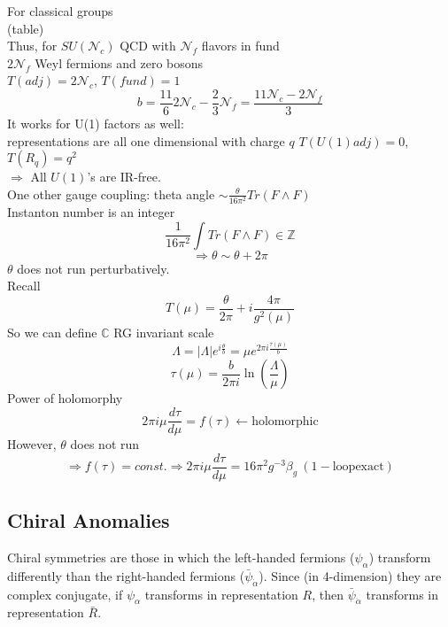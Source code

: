 \documentclass[type = bachelor]{fduthesis-en}
\begin{document}
For classical groups\\
(table)\\
Thus, for $SU(\mathcal{N}_c)$ QCD with $\mathcal{N}_f$ flavors in fund\\ 
$2 \mathcal{N}_f$ Weyl fermions and zero bosons\\
$T(adj)=2\mathcal{N}_c$, $T(fund)=1$
\begin{equation}
b=\frac{11}{6}2\mathcal{N}_c-\frac{2}{3}\mathcal{N}_f=\frac{11\mathcal{N}_c-2\mathcal{N}_f}{3}
\end{equation}
It works for U(1) factors as well:\\
representations are all one dimensional with charge $q$
$T(U(1)adj)=0$, $T(R_q)=q^2$\\
$\Rightarrow$ All $U(1)$'s are IR-free.\\
One other gauge coupling: theta angle $\sim\frac{\theta}{16\pi^2}Tr(F\wedge F)$\\
Instanton number is an integer
\begin{equation}
\frac{1}{16\pi^2}\int Tr(F\wedge F)\in\mathbb{Z}
\end{equation}
\begin{equation}
\Rightarrow\theta\sim\theta+2\pi
\end{equation}
$\theta$ does not run perturbatively.\\
Recall
\begin{equation}
T(\mu)=\frac{\theta}{2\pi}+i\frac{4\pi}{g^2(\mu)}
\end{equation}
So we can define $\mathbb{C}$ RG invariant scale
\begin{equation}
\Lambda=\left|\Lambda\right|e^{i\frac{\theta}{b}}=\mu e^{2\pi i\frac{\tau(\mu)}{b}}
\end{equation}
\begin{equation}
\tau(\mu)=\frac{b}{2\pi i}\ln(\frac{\Lambda}{\mu})
\end{equation}
Power of holomorphy
\begin{equation}
2\pi i\mu\frac{d\tau}{d\mu}=f(\tau)\leftarrow\mathrm{holomorphic}
\end{equation}
However, $\theta$ does not run
\begin{equation}
\Rightarrow f(\tau) = const. \Rightarrow 2\pi i\mu\frac{d\tau}{d\mu}=16\pi^2g^{-3}\beta_g\ \mathrm{(1-loop exact)}
\end{equation}
\subsection{Chiral Anomalies}
Chiral symmetries are those in which the left-handed fermions ($\psi_\alpha$) transform differently than the right-handed fermions ($\bar{\psi}_{\dot{\alpha}}$). Since (in 4-dimension) they are complex conjugate, if $\psi_\alpha$ transforms in representation $R$, then $\bar{\psi}_{\dot{\alpha}}$ transforms in representation $\bar{R}$.
\end{document}
